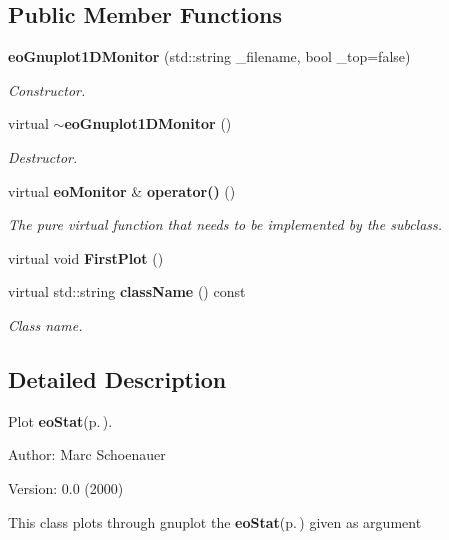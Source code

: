 \subsection*{Public Member Functions}
\begin{CompactItemize}
\item 
{\bf eo\-Gnuplot1DMonitor} (std::string \_\-filename, bool \_\-top=false)\label{classeo_gnuplot1_d_monitor_a0}

\begin{CompactList}\small\item\em Constructor. \item\end{CompactList}\item 
virtual {\bf $\sim$eo\-Gnuplot1DMonitor} ()\label{classeo_gnuplot1_d_monitor_a1}

\begin{CompactList}\small\item\em Destructor. \item\end{CompactList}\item 
virtual {\bf eo\-Monitor} \& {\bf operator()} ()\label{classeo_gnuplot1_d_monitor_a2}

\begin{CompactList}\small\item\em The pure virtual function that needs to be implemented by the subclass. \item\end{CompactList}\item 
virtual void {\bf First\-Plot} ()\label{classeo_gnuplot1_d_monitor_a3}

\item 
virtual std::string {\bf class\-Name} () const \label{classeo_gnuplot1_d_monitor_a4}

\begin{CompactList}\small\item\em Class name. \item\end{CompactList}\end{CompactItemize}


\subsection{Detailed Description}
Plot {\bf eo\-Stat}{\rm (p.\,\pageref{classeo_stat})}. 

\begin{Desc}
\item[Author:]Marc Schoenauer \end{Desc}
\begin{Desc}
\item[Version:]0.0 (2000)\end{Desc}
This class plots through gnuplot the {\bf eo\-Stat}{\rm (p.\,\pageref{classeo_stat})} given as argument

